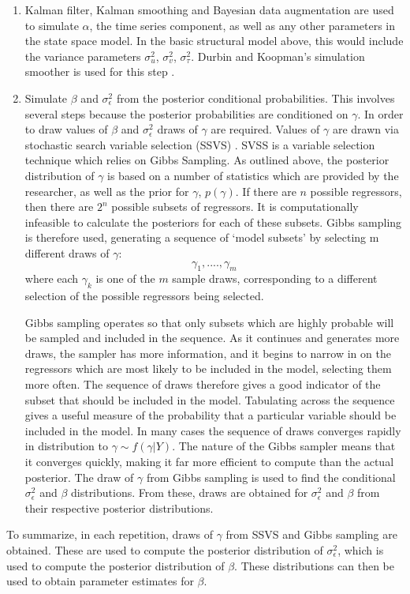 \begin{enumerate}
\item Kalman filter, Kalman smoothing and Bayesian data augmentation are used to simulate $\alpha$, the time series component, as well as any other parameters in the state space model. In the basic structural model above, this would include the variance parameters $\sigma_{u}^{2}$, $\sigma_{v}^{2}$, $\sigma_{\tau}^{2}$.  Durbin and Koopman's simulation smoother is used for this step \cite{durbinkoopman2001}.

\item Simulate $\beta$ and $\sigma_{\epsilon}^{2}$ from the posterior conditional probabilities. This involves several steps because the posterior probabilities are conditioned on $\gamma$. In order to draw values of $\beta$ and $\sigma_{\epsilon}^{2}$ draws of $\gamma$ are required. Values of $\gamma$ are drawn via stochastic search variable selection (SSVS) \cite{georgemcculloh}. 
SVSS is a variable selection technique which relies on Gibbs Sampling. As outlined above, the posterior distribution of $\gamma$ is based on a number of statistics which are provided by the researcher, as well as the prior for $\gamma$, $p(\gamma)$. If there are $n$ possible regressors, then there are $2^{n}$ possible subsets of regressors. It is computationally infeasible to calculate the posteriors for each of these subsets. Gibbs sampling is therefore used, generating a sequence of `model subsets' by selecting m different draws of $\gamma$:
$$ \gamma_{1},....,\gamma_{m} $$
where each $\gamma_k$ is one of the $m$ sample draws, corresponding to a different selection of the possible regressors being selected. 

Gibbs sampling operates so that only subsets which are highly probable will be sampled and included in the sequence. As it continues and generates more draws, the sampler has more information, and it begins to narrow in on the regressors which are most likely to be included in the model, selecting them more often. The sequence of draws therefore gives a good indicator of the subset that should be included in the model. Tabulating across the sequence gives a useful measure of the probability that a particular variable should be included in the model. 
In many cases the sequence of draws converges rapidly in distribution to $\gamma \sim f(\gamma | Y)$. The nature of the Gibbs sampler means that it converges quickly, making it far more efficient to compute than the actual posterior.  The draw of $\gamma$ from Gibbs sampling is used to find the conditional $\sigma_{\epsilon}^{2}$ and $\beta$ distributions. From these, draws are obtained for $\sigma_{\epsilon}^{2}$ and $\beta$ from their respective posterior distributions. 
\end{enumerate}
To summarize, in each repetition, draws of $\gamma$ from SSVS and Gibbs sampling are obtained. These are used to compute the posterior distribution of $\sigma_{\epsilon}^{2}$, which is used to compute the posterior distribution of $\beta$. These distributions can then be used to obtain parameter estimates for $\beta$. 

